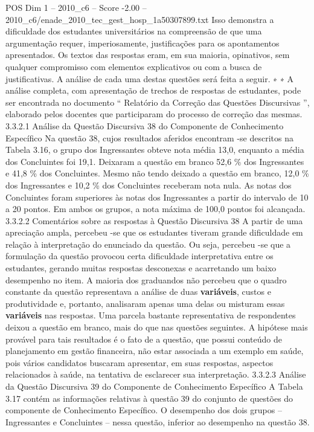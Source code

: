 \begin{textsample}{POS Dim 1 – 2010\_c6 – Score -2.00 – 2010\_c6/enade\_2010\_tec\_gest\_hosp\_1a50307899.txt}
Isso demonstra a dificuldade dos estudantes universitários na compreensão de que uma argumentação requer, imperiosamente, justificações para os apontamentos apresentados.
Os textos das respostas eram, em sua maioria, opinativos, sem qualquer compromisso com elementos explicativos ou com a busca de justificativas.
A análise de cada uma destas questões será feita a seguir. ∗ ∗ A análise completa, com apresentação de trechos de respostas de estudantes, pode ser encontrada no documento “ Relatório da Correção das Questões Discursivas ”, elaborado pelos docentes que participaram do processo de correção das mesmas. 3.3.2.1 Análise da Questão Discursiva 38 do Componente de Conhecimento Específico Na questão 38, cujos resultados aferidos encontram -se descritos na Tabela 3.16, o grupo dos Ingressantes obteve nota média 13,0, enquanto a média dos Concluintes foi 19,1.
Deixaram a questão em branco 52,6 \% dos Ingressantes e 41,8 \% dos Concluintes.
Mesmo não tendo deixado a questão em branco, 12,0 \% dos Ingressantes e 10,2 \% dos Concluintes receberam nota nula.
As notas dos Concluintes foram superiores às notas dos Ingressantes a partir do intervalo de 10 a 20 pontos.
Em ambos os grupos, a nota máxima de 100,0 pontos foi alcançada. 3.3.2.2 Comentários sobre as respostas à Questão Discursiva 38 A partir de uma apreciação ampla, percebeu -se que os estudantes tiveram grande dificuldade em relação à interpretação do enunciado da questão.
Ou seja, percebeu -se que a formulação da questão provocou certa dificuldade interpretativa entre os estudantes, gerando muitas respostas desconexas e acarretando um baixo desempenho no item.
A maioria dos graduandos não percebeu que o quadro constante da questão representava a análise de duas \textbf{variáveis}, custos e produtividade e, portanto, analisaram apenas uma delas ou misturam essas \textbf{variáveis} nas respostas.
Uma parcela bastante representativa de respondentes deixou a questão em branco, mais do que nas questões seguintes.
A hipótese mais provável para tais resultados é o fato de a questão, que possui conteúdo de planejamento em gestão financeira, não estar associada a um exemplo em saúde, pois vários candidatos buscaram apresentar, em suas respostas, aspectos relacionados à saúde, na tentativa de esclarecer sua interpretação. 3.3.2.3 Análise da Questão Discursiva 39 do Componente de Conhecimento Específico A Tabela 3.17 contém as informações relativas à questão 39 do conjunto de questões do componente de Conhecimento Específico.
O desempenho dos dois grupos – Ingressantes e Concluintes – nessa questão, inferior ao desempenho na questão 38.

\end{textsample}
